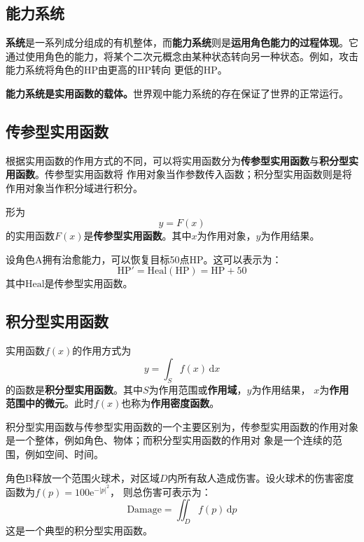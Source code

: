 \documentclass[lang=cn,newtx,10pt,scheme=chinese]{elegantbook}
\newcommand{\md}{\mathrm{d}}
\newcommand{\me}{\mathrm{e}}
\begin{document}
\subsection{能力系统}
\textbf{系统}是一系列成分组成的有机整体，而\textbf{能力系统}则是\textbf{运用角色能力的过程体现}。它
通过使用角色的能力，将某个二次元概念由某种状态转向另一种状态。例如，攻击能力系统将角色的HP由更高的HP转向
更低的HP。

\textbf{能力系统是实用函数的载体。}世界观中能力系统的存在保证了世界的正常运行。

\subsection{传参型实用函数}
根据实用函数的作用方式的不同，可以将实用函数分为\textbf{传参型实用函数}与\textbf{积分型实用函数}。传参型实用函数将
作用对象当作参数传入函数；积分型实用函数则是将作用对象当作积分域进行积分。

\begin{definition}[传参型实用函数]
    形为
    \[
        y = F(x)
    \]
    的实用函数\(F(x)\)是\textbf{传参型实用函数}。其中$x$为作用对象，$y$为作用结果。
\end{definition}

\begin{example}[治愈能力]
    设角色A拥有治愈能力，可以恢复目标50点HP。这可以表示为：
    \[
        \text{HP}' = \text{Heal}(\text{HP}) = \text{HP} + 50
    \]
    其中$\text{Heal}$是传参型实用函数。
\end{example}

\subsection{积分型实用函数}

\begin{definition}[积分型实用函数]
    实用函数\(f(x)\)的作用方式为
    \[
        y = \int_S f(x)\, \md x
    \]
    的函数是\textbf{积分型实用函数}。其中$S$为作用范围或\textbf{作用域}，$y$为作用结果，
    \(x\)为\textbf{作用范围中的微元}。此时\(f(x)\)也称为\textbf{作用密度函数}。
\end{definition}

积分型实用函数与传参型实用函数的一个主要区别为，传参型实用函数的作用对象是一个整体，例如角色、物体；而积分型实用函数的作用对
象是一个连续的范围，例如空间、时间。

\begin{example}[范围伤害]
    角色B释放一个范围火球术，对区域$D$内所有敌人造成伤害。设火球术的伤害密度函数为$f(p)=100\me^{-|p|^2}$，
    则总伤害可表示为：
    \[
        \text{Damage} = \iint_D f(p)\, \md p
    \]
    这是一个典型的积分型实用函数。
\end{example}
\end{document}
